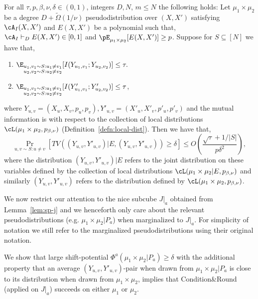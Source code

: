 \begin{lemma}\label{lem:correlation}
For all $\tau,p,\beta,\nu,\delta \in (0,1)$, integers $D,N$, $m \leq N$ the following holds: Let $\mu_1 \times \mu_2$ be a degree $D+\widetilde{\Omega}(1/\nu)$ pseudodistribution over $(X,X')$ satisfying $\cA_I(X,X')$ and $E(X,X')$ be a polynomial such that, $\cA_I \vdash_D E(X,X') \in [0,1]$ and $\pE_{\mu_1 \times \mu_2}[E(X,X')] \geq p$. Suppose for $S \subseteq [N]$ we have that, 
\begin{enumerate}
\item $\E_{\substack{u_1,v_1 \sim S: u_1 \neq v_1\\ u_2,v_2 \sim S: u_2 \neq v_2}}[I(Y_{u_1,v_1};Y_{u_2,v_2})] \leq \tau.$
\item $\E_{\substack{u_1,v_1 \sim S: u_1 \neq v_1\\ u_2,v_2 \sim S: u_2 \neq v_2}}[I(Y'_{u_1,v_1};Y'_{u_2,v_2})] \leq \tau$,
\end{enumerate}
where $Y_{u,v} = (X_u,X_v,p_u,p_v), Y'_{u,v} = (X'_u,X'_v,p'_u,p'_v)$ and the mutual information is with respect to the collection of local distributions $\cL(\mu_1 \times \mu_2,p_{\beta,\nu})$ (Definition~\ref{defn:local-dist}). Then we have that, 
\[\Pr_{u,v \sim S: u \neq v}[ TV((Y_{u,v},Y'_{u,v})|E , (Y_{u,v},Y'_{u,v})) \geq \delta] \leq O\left(\frac{\sqrt{\tau}+ 1/|S|}{p\delta^2}\right),\]
where the distribution $(Y_{u,v},Y'_{u,v})|E$ refers to the joint distribution on these variables defined by the collection of local distributions $\cL(\mu_1 \times \mu_2|E, p_{\beta,\nu})$ and similarly $(Y_{u,v},Y'_{u,v})$ refers to the distribution defined by $\cL(\mu_1 \times \mu_2,p_{\beta,\nu})$.
\end{lemma}



We now restrict our attention to the nice subcube $J|_a$ obtained from Lemma~\ref{lem:sp-j} and we henceforth only care about the relevant pseudodistributions (e.g. $\mu_1 \times \mu_2|P_a$) when marginalized to $J|_a$. For simplicity of notation we still refer to the marginalized pseudodistributions using their original notation.

We show that large shift-potential $\Phi^a(\mu_1 \times \mu_2 | P_a) \geq \delta$ with the additional property that an average $(Y_{u,v}, Y'_{u,v})$-pair when drawn from $\mu_1 \times \mu_2 |P_a$ is close to its distribution when drawn from $\mu_1 \times \mu_2$, implies that Condition\&Round (applied on $J|_a$) succeeds on either $\mu_1$ or $\mu_2$.

